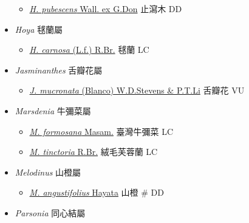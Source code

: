 \begin{itemize}
  \begin{itemize}
        \item[] \href{http://www.theplantlist.org/tpl1.1/search?q=Holarrhena+pubescens}{\textit{H. pubescens} Wall. ex G.Don}   止瀉木   DD
  \end{itemize}
 \item[] \textit{Hoya} 毬蘭屬
                                
  \begin{itemize}
        \item[] \href{http://www.theplantlist.org/tpl1.1/search?q=Hoya+carnosa}{\textit{H. carnosa} (L.f.) R.Br.}   毬蘭   LC
  \end{itemize}
 \item[] \textit{Jasminanthes} 舌瓣花屬
                                
  \begin{itemize}
        \item[] \href{http://www.theplantlist.org/tpl1.1/search?q=Jasminanthes+mucronata}{\textit{J. mucronata} (Blanco) W.D.Stevens \& P.T.Li}   舌瓣花   VU
  \end{itemize}
 \item[] \textit{Marsdenia} 牛彌菜屬
                                
  \begin{itemize}
        \item[] \href{http://www.theplantlist.org/tpl1.1/search?q=Marsdenia+formosana}{\textit{M. formosana} Masam.}   臺灣牛彌菜   LC
        \item[] \href{http://www.theplantlist.org/tpl1.1/search?q=Marsdenia+tinctoria}{\textit{M. tinctoria} R.Br.}   絨毛芙蓉蘭   LC
  \end{itemize}
 \item[] \textit{Melodinus} 山橙屬
                                
  \begin{itemize}
        \item[] \href{http://www.theplantlist.org/tpl1.1/search?q=Melodinus+angustifolius}{\textit{M. angustifolius} Hayata}   山橙  \# DD
  \end{itemize}
 \item[] \textit{Parsonia} 同心結屬
                                

\end{itemize}
